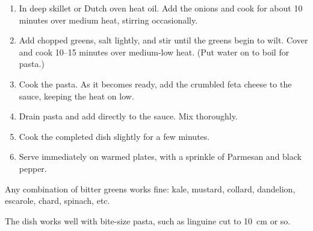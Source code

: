 
\begin{ingredients}
\end{ingredients}


\begin{recipe}
  \begin{enumerate}

  \item In deep skillet or Dutch oven heat oil.  Add the onions and
    cook for about 10 minutes over medium heat, stirring occasionally.

  \item Add chopped greens, salt lightly, and stir until the greens
    begin to wilt.  Cover and cook 10--15 minutes over medium-low
    heat.  (Put water on to boil for pasta.)

  \item Cook the pasta.  As it becomes ready, add the crumbled feta
    cheese to the sauce, keeping the heat on low.

  \item Drain pasta and add directly to the sauce.  Mix thoroughly.

  \item Cook the completed dish slightly for a few minutes.

  \item Serve immediately on warmed plates, with a sprinkle of
    Parmesan and black pepper.

  \end{enumerate}

  Any combination of bitter greens works fine: kale, mustard, collard,
  dandelion, escarole, chard, spinach, etc.

  The dish works well with bite-size pasta, such as linguine cut to
  10~cm or so.
\end{recipe}
